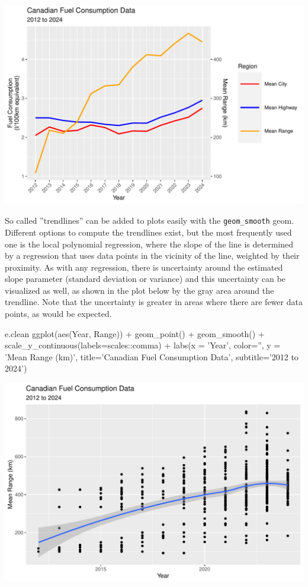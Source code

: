 \begin{center}
  \includegraphics[width=.8\textwidth]{fuel.linesTwoScales.pdf}
\end{center}

So called ''trendlines'' can be added to plots easily with the \texttt{geom\_smooth} geom. Different options to compute the trendlines exist, but the most frequently used one is the local polynomial regression, where the slope of the line is determined by a regression that uses data points in the vicinity of the line, weighted by their proximity. As with any regression, there is uncertainty around the estimated slope parameter (standard deviation or variance) and this uncertainty can be visualized as well, as shown in the plot below by the gray area around the trendline. Note that the uncertainty is greater in areas where there are fewer data points, as would be expected.

\begin{samepage}
\begin{Rcode}
e.clean %
  ggplot(aes(Year, Range)) +
    geom_point() +
    geom_smooth() +
    scale_y_continuous(labels=scales::comma) + 
    labs(x = 'Year', color='', y = 'Mean Range (km)', 
         title='Canadian Fuel Consumption Data', 
         subtitle='2012 to 2024')
\end{Rcode}
\end{samepage}

\begin{center}
  \includegraphics[width=.8\textwidth]{fuel.linesSmooth.pdf}
\end{center}

